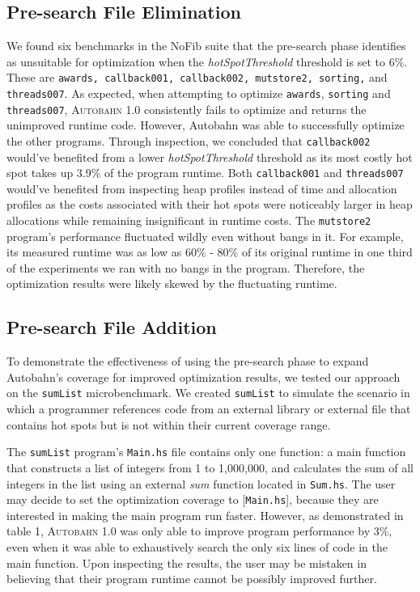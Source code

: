 \documentclass[format=sigplan, review=true]{acmart}
\newcommand{\hotspots}[0]{hot spots}
\newcommand{\hotspotcost}[0]{\textit{hotSpotThreshold}}
\newcommand{\Ao}[0]{\textsc{Autobahn 1.0}}
\newcommand{\preopt}[0]{pre-search}
\newcommand{\Preopt}[0]{Pre-search}
\newcommand{\unimp}[0]{unimproved}
\begin{document}
\subsection{\Preopt{} File Elimination}
\label{sec:file-elim}

We found six benchmarks in the NoFib suite that the \preopt{} phase identifies as unsuitable for optimization when the \hotspotcost{} threshold is set to 6\%. These are \texttt{awards, callback001, callback002, mutstore2, sorting,} and \texttt{threads007}. As expected, when attempting to optimize \texttt{awards}, \texttt{sorting} and \texttt{threads007}, \Ao{} consistently fails to optimize and returns the \unimp{} runtime code. However, Autobahn was able to successfully optimize the other programs. Through inspection, we concluded that \texttt{callback002} would've benefited from a lower \hotspotcost{} threshold as its most costly hot spot takes up 3.9\% of the program runtime. Both \texttt{callback001} and \texttt{threads007} would've benefited from inspecting heap profiles instead of time and allocation profiles as the costs associated with their hot spots were noticeably larger in heap allocations while remaining insignificant in runtime costs. The \texttt{mutstore2} program's performance fluctuated wildly even without bangs in it. For example, its measured runtime was as low as 60\% - 80\% of its original runtime in one third of the experiments we ran with no bangs in the program. Therefore, the optimization results were likely skewed by the fluctuating runtime.

\subsection{\Preopt{} File Addition}

To demonstrate the effectiveness of using the \preopt{} phase to expand Autobahn's coverage for improved optimization results, we tested our approach on the \texttt{sumList} microbenchmark. We created \texttt{sumList} to simulate the scenario in which a programmer references code from an external library or external file that contains \hotspots{} but is not within their current coverage range. 


The \texttt{sumList} program's \texttt{Main.hs} file contains only one function: a main function that constructs a list of integers from 1 to 1,000,000, and calculates the sum of all integers in the list using an external \textit{sum} function located in \texttt{Sum.hs}. The user may decide to set the optimization coverage to [\texttt{Main.hs}], because they are interested in making the main program run faster. However, as demonstrated in table 1, \Ao{} was only able to improve program performance by 3\%, even when it was able to exhaustively search the only six lines of code in the main function. Upon inspecting the results, the user may be mistaken in believing that their program runtime cannot be possibly improved further. 
\end{document}
